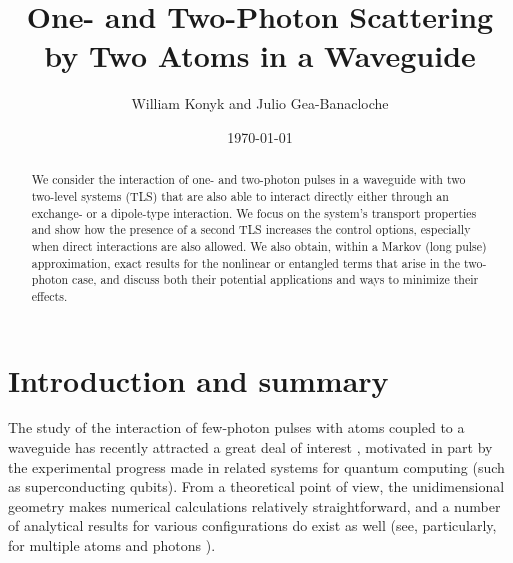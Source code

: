 \documentclass[aps,pra,twocolumn,floatfix,superscriptaddress]{revtex4}
\begin{document}
\def\ket#1{|#1\rangle} 
\def\bra#1{\langle#1|}
\def\av#1{\langle#1\rangle}
\def\dkp#1{\kappa+i(\Delta+#1)}
\def\dkm#1{\kappa-i(\Delta+#1)}
\def\pp{{\prime\prime}}
\def\ppp{{\prime\prime\prime}}
\def\w{\omega}
\def\k{\kappa}
\def\D{\Delta}
\def\wp{\omega^\prime}
\def\wpp{\omega^{\prime\prime}}

\def\u{\color{blue}}
\def\r{\color{red}}
\def\b{\color{black}}

\title{One- and Two-Photon Scattering by Two Atoms in a Waveguide}
\author{William Konyk and Julio Gea-Banacloche}

\date{\today}

\begin{abstract}
We consider the interaction of one- and two-photon pulses in a waveguide with two two-level systems (TLS) that are also able to interact directly either through an exchange- or a dipole-type interaction.  We focus on the system's transport properties and show how the presence of a second TLS increases the control options, especially when direct interactions are also allowed.  We also obtain, within a Markov (long pulse) approximation, exact results for the nonlinear or entangled terms that arise in the two-photon case, and discuss both their potential applications and ways to minimize their effects. 
\end{abstract}
\maketitle

\section{Introduction and summary}
The study of the interaction of few-photon pulses with atoms coupled to a waveguide has recently attracted a great deal of interest \cite{shen1,gauthier,hach,fan1,mork1,combes,gritsev,garciavidal1,zheng2,zheng3,sanders,garciavidal2,laakso,epj,mork2,fan15,zheng4,zubairy1,cirac,us,roulet,mirza1,mirza2,interactions}, motivated in part by the experimental progress made in related systems for quantum computing (such as superconducting qubits).  From a theoretical point of view, the unidimensional geometry makes numerical calculations relatively straightforward, and a number of analytical results for various configurations do exist as well (see, particularly, for multiple atoms and photons \cite{gritsev,fan15,laakso,zheng4,cirac}).  
\end{document}
